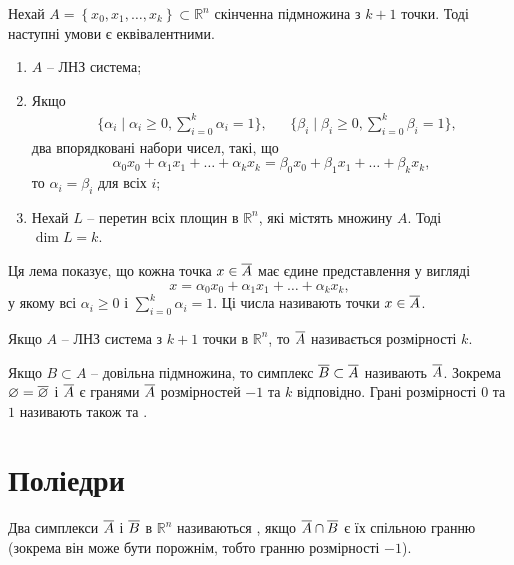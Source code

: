 \begin{lemma}\label{lm:charact:LNZ}
Нехай $A=\left\{x_{0}, x_{1}, \ldots, x_{k}\right\} \subset \mathbb{R}^{n}$ скінченна підмножина з $k+1$  точки.
Тоді наступні умови є еквівалентними.
\begin{enumerate}[label={\rm(\arabic*)}, itemsep=1ex]
\item
$A$ -- ЛНЗ система;
\item
Якщо
\begin{align*}
    &\{ \alpha_{i} \mid \alpha_i \geq0, \sum_{i=0}^{k}\alpha_i = 1 \}, &
    &\{ \beta_{i} \mid \beta_i \geq0, \sum_{i=0}^{k}\beta_i = 1 \},
\end{align*}
два впорядковані набори чисел, такі, що
\[
    \alpha_{0} x_{0}+\alpha_{1} x_{1}+\ldots+\alpha_{k} x_{k} =
    \beta_{0} x_{0}+\beta_{1} x_{1}+\ldots+\beta_{k} x_{k},
\]
то $\alpha_i = \beta_i$ для всіх $i$;

\item
Нехай $L$ -- перетин всіх площин в $\mathbb{R}^n$, які містять множину $A$.
Тоді $\dim L = k$.
\end{enumerate}
\end{lemma}

Ця лема показує, що кожна точка $x \in \overline{A}$ має єдине представлення у вигляді
\[ x= \alpha_{0} x_{0}+\alpha_{1} x_{1} + \ldots + \alpha_{k} x_{k}, \]
у якому всі $\alpha_i \geq0$ і $\sum\limits_{i=0}^{k}\alpha_i = 1$.
Ці числа називають  точки $x\in\overline{A}$.


\begin{definition}[Симплекс]
Якщо $A$ -- ЛНЗ система з $k+1$ точки в $\mathbb{R}^n$, то $\overline{A}$ називається  розмірності $k$.

Якщо $B\subset A$ -- довільна підмножина, то симплекс $\overline{B} \subset \overline{A}$ називають  $\overline{A}$.
Зокрема $\varnothing = \overline{\varnothing}$ і $\overline{A}$ є гранями $\overline{A}$ розмірностей $-1$ та $k$ відповідно.
Грані розмірності $0$ та $1$ називають також  та .
\end{definition}


\section{Поліедри}

\begin{definition}
Два симплекси $\overline{A}$ і $\overline{B}$ в $\mathbb{R}^n$ називаються , якщо $\overline{A} \cap \overline{B}$ є їх спільною гранню (зокрема він може бути порожнім, тобто гранню розмірності $-1$).
\end{definition}


